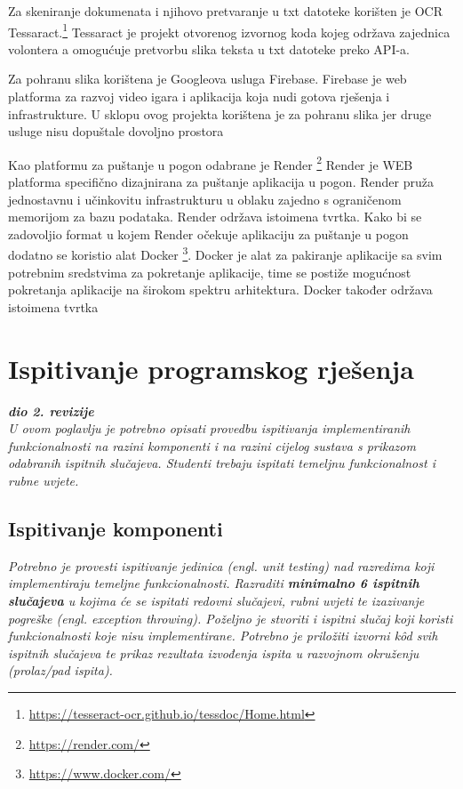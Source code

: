 			Za skeniranje dokumenata i njihovo pretvaranje u txt datoteke korišten je OCR Tessaract.\footnote{\url{https://tesseract-ocr.github.io/tessdoc/Home.html}} Tessaract je projekt otvorenog izvornog koda kojeg održava zajednica volontera a omogućuje pretvorbu slika teksta u txt datoteke preko API-a.
			
			Za pohranu slika korištena je Googleova usluga Firebase. Firebase je web platforma za razvoj video igara i aplikacija koja nudi gotova rješenja i infrastrukture. U sklopu ovog projekta korištena je za pohranu slika jer druge usluge nisu dopuštale dovoljno prostora
			
			Kao platformu za puštanje u pogon odabrane je Render \footnote{\url{https://render.com/}} Render je WEB platforma specifično dizajnirana za puštanje aplikacija u pogon. Render pruža jednostavnu i učinkovitu infrastrukturu u oblaku zajedno s ograničenom memorijom za bazu podataka. Render održava istoimena tvrtka. Kako bi se zadovoljio format u kojem Render očekuje aplikaciju za puštanje u pogon dodatno se koristio alat Docker \footnote{\url{https://www.docker.com/}}. Docker je alat za pakiranje aplikacije sa svim potrebnim sredstvima za pokretanje aplikacije, time se postiže mogućnost pokretanja aplikacije na širokom spektru arhitektura. Docker također održava istoimena tvrtka
			
		
	
		\section{Ispitivanje programskog rješenja}
			
			\textbf{\textit{dio 2. revizije}}\\
			
			 \textit{U ovom poglavlju je potrebno opisati provedbu ispitivanja implementiranih funkcionalnosti na razini komponenti i na razini cijelog sustava s prikazom odabranih ispitnih slučajeva. Studenti trebaju ispitati temeljnu funkcionalnost i rubne uvjete.}
	
			
			\subsection{Ispitivanje komponenti}
			\textit{Potrebno je provesti ispitivanje jedinica (engl. unit testing) nad razredima koji implementiraju temeljne funkcionalnosti. Razraditi \textbf{minimalno 6 ispitnih slučajeva} u kojima će se ispitati redovni slučajevi, rubni uvjeti te izazivanje pogreške (engl. exception throwing). Poželjno je stvoriti i ispitni slučaj koji koristi funkcionalnosti koje nisu implementirane. Potrebno je priložiti izvorni kôd svih ispitnih slučajeva te prikaz rezultata izvođenja ispita u razvojnom okruženju (prolaz/pad ispita). }
			
